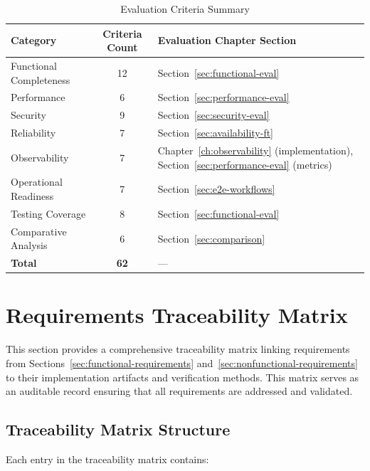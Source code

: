 \documentclass[a4paper,twoside]{sapthesis}
\begin{document}
\begin{table}[htbp]
\centering
\caption{Evaluation Criteria Summary}
\label{tab:eval-summary}
\small
\begin{tabular}{|l|c|l|}
\hline
\textbf{Category} & \textbf{Criteria Count} & \textbf{Evaluation Chapter Section} \\
\midrule
Functional Completeness & 12 & Section~\ref{sec:functional-eval} \\
\midrule
Performance & 6 & Section~\ref{sec:performance-eval} \\
\midrule
Security & 9 & Section~\ref{sec:security-eval} \\
\midrule
Reliability & 7 & Section~\ref{sec:availability-ft} \\
\midrule
Observability & 7 & Chapter~\ref{ch:observability} (implementation), Section~\ref{sec:performance-eval} (metrics) \\
\midrule
Operational Readiness & 7 & Section~\ref{sec:e2e-workflows} \\
\midrule
Testing Coverage & 8 & Section~\ref{sec:functional-eval} \\
\midrule
Comparative Analysis & 6 & Section~\ref{sec:comparison} \\
\midrule
\textbf{Total} & \textbf{62} & --- \\
\midrule
\end{tabular}
\end{table}

\section{Requirements Traceability Matrix}
\label{sec:traceability-matrix}

This section provides a comprehensive traceability matrix linking requirements from Sections~\ref{sec:functional-requirements} and~\ref{sec:nonfunctional-requirements} to their implementation artifacts and verification methods. This matrix serves as an auditable record ensuring that all requirements are addressed and validated.

\subsection{Traceability Matrix Structure}
\label{subsec:traceability-structure}

Each entry in the traceability matrix contains:
\end{document}
